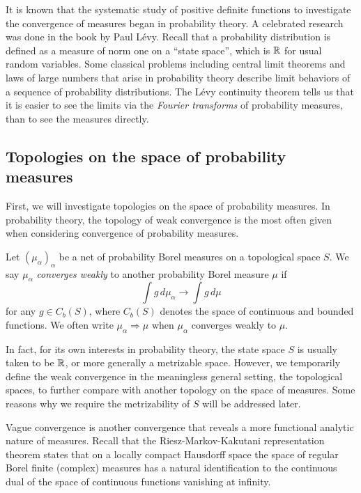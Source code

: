 \documentclass{../../small}
\begin{document}
It is known that the systematic study of positive definite functions to investigate the convergence of measures began in probability theory.
A celebrated research was done in the book \cite{levy1925calcul} by Paul L\'evy.
Recall that a probability distribution is defined as a measure of norm one on a ``state space'', which is $\mathbb{R}$ for usual random variables.
Some classical problems including central limit theorems and laws of large numbers that arise in probability theory describe limit behaviors of a sequence of probability distributions.
The L\'evy continuity theorem tells us that it is easier to see the limits via the \emph{Fourier transforms} of probability measures, than to see the measures directly.


\subsection{Topologies on the space of probability measures}

First, we will investigate topologies on the space of probability measures.
In probability theory, the topology of weak convergence is the most often given when considering convergence of probability measures.

\begin{defn}
Let $(\mu_\alpha)_\alpha$ be a net of probability Borel measures on a topological space $S$.
We say $\mu_\alpha$ \emph{converges weakly} to another probability Borel measure $\mu$ if
\[\int g\,d\mu_\alpha\to\int g\,d\mu\]
for any $g\in C_b(S)$, where $C_b(S)$ denotes the space of continuous and bounded functions.
We often write $\mu_\alpha\Rightarrow\mu$ when $\mu_\alpha$ converges weakly to $\mu$.
\end{defn}

In fact, for its own interests in probability theory, the state space $S$ is usually taken to be $\mathbb{R}$, or more generally a metrizable space.
However, we temporarily define the weak convergence in the meaningless general setting, the topological spaces, to further compare with another topology on the space of measures.
Some reasons why we require the metrizability of $S$ will be addressed later.

Vague convergence is another convergence that reveals a more functional analytic nature of measures.
Recall that the Riesz-Markov-Kakutani representation theorem states that on a locally compact Hausdorff space the space of regular Borel finite (complex) measures has a natural identification to the continuous dual of the space of continuous functions vanishing at infinity.
\end{document}
